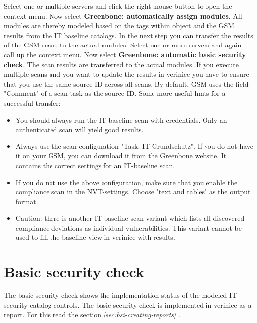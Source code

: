 \documentclass[a4paper,10pt]{book}
\begin{document}
Select one or multiple servers and click the right mouse button to open the context menu. Now select \textbf{Greenbone: automatically assign modules}.
 All modules are thereby modeled based on the tags within object and the GSM results from the IT baseline catalogs.
 In the next step you can transfer the results of the GSM scans to the
 actual modules:
 Select one or more servers and
 again call up the context menu. Now select \textbf{Greenbone: automatic basic security check}.
The scan results are transferred to the actual modules. If you execute multiple scans and you want to update the results in verinice you have to ensure that you use the same source ID across all scans. By default, GSM uses the field "Comment" of a scan task as the source ID.
Some more useful hints for a successful transfer:
\begin{itemize}
    \item You should always run the IT-baseline scan with credentials. Only an authenticated scan will yield good results.
    \item Always use the scan configuration "Task: IT-Grundschutz". If you do not have it on your GSM, you can download it from the Greenbone website. It contains the correct settings for an IT-baseline scan.
    \item If you do not use the above configuration, make sure that you enable the compliance scan in the NVT-settings. Choose "text and tables" as the output format.
    \item Caution: there is another IT-baseline-scan variant which lists all discovered compliance-deviations as individual vulnerabilities. This variant cannot be used to fill the baseline view in verinice with results.
\end{itemize}

\section{Basic security check}
The basic security check shows the implementation status of the
modeled IT-security catalog controls.  The basic security check is
implemented in verinice as a report. For this read the section {\em
  \ref{sec:bsi-creating-reports} }.
\end{document}
